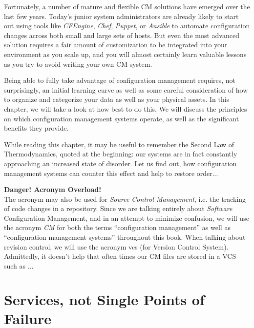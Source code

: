 Fortunately, a number of mature and flexible CM
solutions have emerged over the last few years.
Today's junior system administrators are already
likely to start out using tools like {\em
CFEngine}\cite{configuration-management:burgess:cfengine},
{\em
Chef}\cite{configuration-management:nelson-smith:chef},
{\em
Puppet}\cite{configuration-management:turnbull:pro-puppet},
or {\em
Ansible}\cite{configuration-management:ansible} to
automate configuration changes across both small and
large sets of hosts.  But even the most advanced
solution requires a fair amount of customization to be
integrated into your environment as you scale up, and
you will almost certainly learn valuable lessons as
you try to avoid writing your own CM system.

Being able to fully take advantage of configuration
management requires, not surprisingly, an initial
learning curve as well as some careful consideration
of how to organize and categorize your data as well as
your physical assets.  In this chapter, we will take a
look at how best to do this.  We will discuss the
principles on which configuration management systems
operate, as well as the significant benefits they
provide.

While reading this chapter, it may be useful to
remember the Second Law of Thermodynamics, quoted at
the beginning: our systems are in fact constantly
approaching an increased state of disorder.  Let us
find out, how configuration management systems can
counter this effect and help to restore order...

\begin{sidenote} {\bf Danger! Acronym Overload!} \\

The acronym {\em {}} may also be used
for {\em Source Control Management}, i.e. the tracking of code changes
in a repository.  Since we are talking entirely
about {\em Software} Configuration Management, and in
an attempt to minimize confusion, we will use the
acronym {\em CM} for both the terms ``configuration
management'' as well as ``configuration management
systems'' throughout this book.  When talking about
revision control, we will use
the acronym \acrshort{vcs} (for Version
Control System).  Admittedly, it doesn't help that
often times our CM files are stored in a VCS such as
...  \end{sidenote}


\section{Services, not Single Points of Failure}
\label{configuration-management:services-not-spofs}

